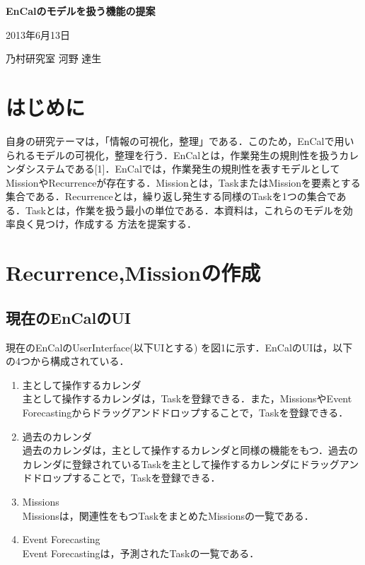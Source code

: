 \documentclass[fleqn, 14pt]{extarticlej}
\begin{document}
\begin{center}
{\Large {\bf EnCalのモデルを扱う機能の提案}}

\end{center}
\begin{flushright}
2013年6月13日

乃村研究室 河野 達生
\end{flushright}
\section{はじめに}
自身の研究テーマは，「情報の可視化，整理」である．このため，EnCalで用いられるモデルの可視化，整理を行う．EnCalとは，作業発生の規則性を扱うカレンダシステムである[1]．EnCalでは，作業発生の規則性を表すモデルとしてMissionやRecurrenceが存在する．Missionとは，TaskまたはMissionを要素とする集合である．Recurrenceとは，繰り返し発生する同様のTaskを1つの集合である．Taskとは，作業を扱う最小の単位である．本資料は，これらのモデルを効率良く見つけ，作成する
方法を提案する．

\section{Recurrence,Missionの作成}
\subsection{現在のEnCalのUI}
現在のEnCalのUserInterface(以下UIとする) を図1に示す．EnCalのUIは，以下の4つから構成されている．
\begin{enumerate}
	\item 主として操作するカレンダ\\
	主として操作するカレンダは，Taskを登録できる．また，MissionsやEvent Forecastingからドラッグアンドドロップすることで，Taskを登録できる．
	\item 過去のカレンダ\\
	過去のカレンダは，主として操作するカレンダと同様の機能をもつ．過去のカレンダに登録されているTaskを主として操作するカレンダにドラッグアンドドロップすることで，Taskを登録できる．
	\item Missions\\
	Missionsは，関連性をもつTaskをまとめたMissionsの一覧である．
	\item Event Forecasting\\
	Event Forecastingは，予測されたTaskの一覧である．

\end{enumerate}
\end{document}
